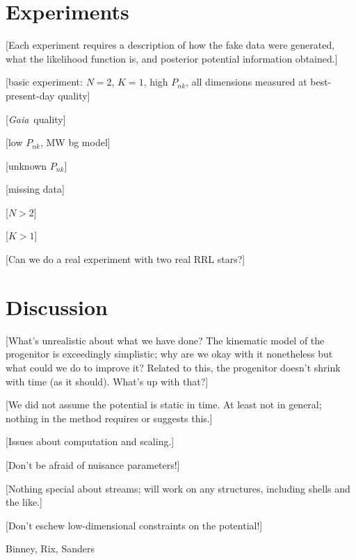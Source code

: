 \documentclass[letterpaper,12pt,preprint]{aastex}
\newcommand{\project}[1]{\textsl{#1}}
\newcommand{\gaia}{\project{Gaia}}
\begin{document}
\section{Experiments}

[Each experiment requires a description of how the fake data were
  generated, what the likelihood function is, and posterior potential
  information obtained.]

[basic experiment: $N=2$, $K=1$, high $P_{nk}$, all dimensions
  measured at best-present-day quality]

[\gaia\ quality]

[low $P_{nk}$, MW bg model]

[unknown $P_{nk}$]

[missing data]

[$N>2$]

[$K>1$]

[Can we do a real experiment with two real RRL stars?]

\section{Discussion}

[What's unrealistic about what we have done?  The kinematic model of
  the progenitor is exceedingly simplistic; why are we okay with it
  nonetheless but what could we do to improve it?  Related to this,
  the progenitor doesn't shrink with time (as it should).  What's up
  with that?]

[We did not assume the potential is static in time.  At least not in
  general; nothing in the method requires or suggests this.]

[Issues about computation and scaling.]

[Don't be afraid of nuisance parameters!]

[Nothing special about streams; will work on any structures, including
  shells and the like.]

[Don't eschew low-dimensional constraints on the potential!]

\acknowledgements
Binney, Rix, Sanders
\end{document}
